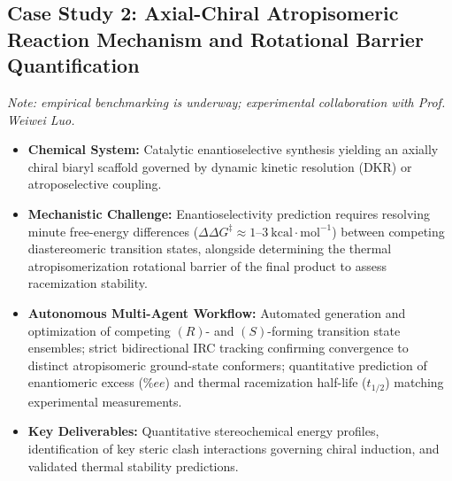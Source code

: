 \documentclass[10pt,twocolumn,letterpaper]{article}
\begin{document}
\subsection{Case Study 2: Axial-Chiral Atropisomeric Reaction Mechanism and Rotational Barrier Quantification}
\textit{Note: empirical benchmarking is underway; experimental collaboration with Prof. Weiwei Luo.}
\begin{itemize}[leftmargin=*]
\item \textbf{Chemical System:} Catalytic enantioselective synthesis yielding an axially chiral biaryl scaffold governed by dynamic kinetic resolution (DKR) or atroposelective coupling.
\item \textbf{Mechanistic Challenge:} Enantioselectivity prediction requires resolving minute free-energy differences ($\Delta\Delta G^\ddagger \approx 1\text{--}3\ \mathrm{kcal\cdot mol^{-1}}$) between competing diastereomeric transition states, alongside determining the thermal atropisomerization rotational barrier of the final product to assess racemization stability.
\item \textbf{Autonomous Multi-Agent Workflow:} Automated generation and optimization of competing $(R)$- and $(S)$-forming transition state ensembles; strict bidirectional IRC tracking confirming convergence to distinct atropisomeric ground-state conformers; quantitative prediction of enantiomeric excess ($\%ee$) and thermal racemization half-life ($t_{1/2}$) matching experimental measurements.
\item \textbf{Key Deliverables:} Quantitative stereochemical energy profiles, identification of key steric clash interactions governing chiral induction, and validated thermal stability predictions.
\end{itemize}
\end{document}
